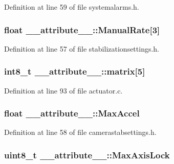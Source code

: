 \-Definition at line 59 of file systemalarms.\-h.

\hypertarget{struct____attribute_____a9e7aa721ebbaedf867ea9b9edac022c9}{
\subsubsection[{\-Manual\-Rate}]{\setlength{\rightskip}{0pt plus 5cm}float {\bf \-\_\-\-\_\-attribute\-\_\-\-\_\-\-::\-Manual\-Rate}\mbox{[}3\mbox{]}}}\label{struct____attribute_____a9e7aa721ebbaedf867ea9b9edac022c9}


\-Definition at line 57 of file stabilizationsettings.\-h.

\hypertarget{struct____attribute_____a443b6e5347cb65e8a297b596be99e467}{
\subsubsection[{matrix}]{\setlength{\rightskip}{0pt plus 5cm}int8\-\_\-t {\bf \-\_\-\-\_\-attribute\-\_\-\-\_\-\-::matrix}\mbox{[}5\mbox{]}}}\label{struct____attribute_____a443b6e5347cb65e8a297b596be99e467}


\-Definition at line 93 of file actuator.\-c.

\hypertarget{struct____attribute_____a894fe83435d7d83be6d314fd45cfba97}{
\subsubsection[{\-Max\-Accel}]{\setlength{\rightskip}{0pt plus 5cm}float {\bf \-\_\-\-\_\-attribute\-\_\-\-\_\-\-::\-Max\-Accel}}}\label{struct____attribute_____a894fe83435d7d83be6d314fd45cfba97}


\-Definition at line 58 of file camerastabsettings.\-h.

\hypertarget{struct____attribute_____a8039c96bd1803d640822a336c4c8cfcf}{
\subsubsection[{\-Max\-Axis\-Lock}]{\setlength{\rightskip}{0pt plus 5cm}uint8\-\_\-t {\bf \-\_\-\-\_\-attribute\-\_\-\-\_\-\-::\-Max\-Axis\-Lock}}}\label{struct____attribute_____a8039c96bd1803d640822a336c4c8cfcf}


